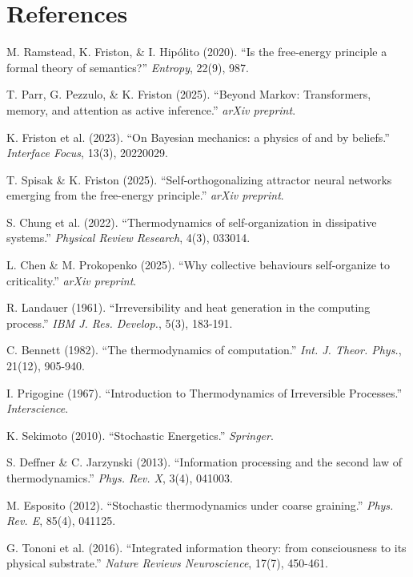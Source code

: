 \documentclass[11pt,a4paper]{article}
\begin{document}
\section*{References}

\begin{enumerate}[label={[\arabic*]}]
\item M. Ramstead, K. Friston, \& I. Hip\'olito (2020). ``Is the free-energy principle a formal theory of semantics?'' \textit{Entropy}, 22(9), 987.
\item T. Parr, G. Pezzulo, \& K. Friston (2025). ``Beyond Markov: Transformers, memory, and attention as active inference.'' \textit{arXiv preprint}.
\item K. Friston et al. (2023). ``On Bayesian mechanics: a physics of and by beliefs.'' \textit{Interface Focus}, 13(3), 20220029.
\item T. Spisak \& K. Friston (2025). ``Self-orthogonalizing attractor neural networks emerging from the free-energy principle.'' \textit{arXiv preprint}.
\item S. Chung et al. (2022). ``Thermodynamics of self-organization in dissipative systems.'' \textit{Physical Review Research}, 4(3), 033014.
\item L. Chen \& M. Prokopenko (2025). ``Why collective behaviours self-organize to criticality.'' \textit{arXiv preprint}.
\item R. Landauer (1961). ``Irreversibility and heat generation in the computing process.'' \textit{IBM J. Res. Develop.}, 5(3), 183-191.
\item C. Bennett (1982). ``The thermodynamics of computation.'' \textit{Int. J. Theor. Phys.}, 21(12), 905-940.
\item I. Prigogine (1967). ``Introduction to Thermodynamics of Irreversible Processes.'' \textit{Interscience}.
\item K. Sekimoto (2010). ``Stochastic Energetics.'' \textit{Springer}.
\item S. Deffner \& C. Jarzynski (2013). ``Information processing and the second law of thermodynamics.'' \textit{Phys. Rev. X}, 3(4), 041003.
\item M. Esposito (2012). ``Stochastic thermodynamics under coarse graining.'' \textit{Phys. Rev. E}, 85(4), 041125.
\item G. Tononi et al. (2016). ``Integrated information theory: from consciousness to its physical substrate.'' \textit{Nature Reviews Neuroscience}, 17(7), 450-461.
\end{enumerate}
\end{document}
